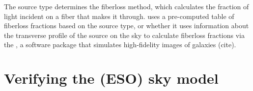 The source type determines the fiberloss method, which calculates the fraction of light incident on a fiber that makes it through. uses a pre-computed table of fiberloss fractions based on the source type, or whether it uses information about the transverse profile of the source on the sky to calculate fiberloss fractions via the , a software package that simulates high-fidelity images of galaxies (cite).



\section{Verifying the (ESO) sky model}


